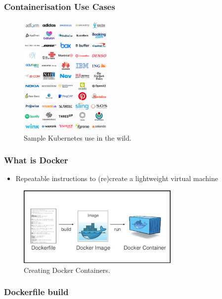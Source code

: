 \documentclass{beamer}
\begin{document}
  \begin{frame}
    \frametitle{Containerisation Use Cases}
    \begin{figure}[th!]
      \centering
      \includegraphics[width=0.4\textwidth]{kube_case_studies.png}
      \caption{Sample Kubernetes use in the wild. \autocite{kube_cases}}
      \label{fig:kube_use}
    \end{figure}
  \end{frame}

  \begin{frame}
    \frametitle{What is Docker}
    \begin{itemize}
        \item Repeatable instructions to (re)create a lightweight virtual machine
    \end{itemize}
    \begin{figure}[th!]
      \centering
      \includegraphics[width=0.7\textwidth]{docker_process.png}
      \caption{Creating Docker Containers. \autocite{docker_build}}
      \label{fig:docker_build}
    \end{figure}
  \end{frame}

  \begin{frame}
    \frametitle{Dockerfile build}
    \inputminted{dockerfile}{content/src/Dockerfile}

  \end{frame}
\end{document}
